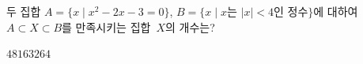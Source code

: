 두 집합 $A=\{x \mid x^2-2x-3=0\}$, $B=\{x \mid x$는 $|x|<4$인 정수$\}$에 대하여 $A\subset X\subset B$를 만족시키는 집합~$X$의 개수는?
\begin{choices32}{$4$}{$8$}{$16$}{$32$}{$64$}\end{choices32}
